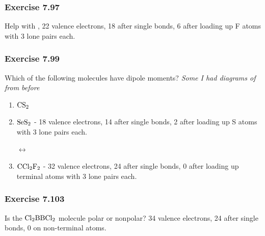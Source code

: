 \documentclass[11pt]{article}
\begin{document}
\subsubsection{Exercise 7.97}

Help with , 22 valence electrons, 18 after single bonds, 6 after loading up F atoms with 3 lone pairs each. \\[2ex]

\subsubsection{Exercise 7.99}

Which of the following molecules have dipole moments?
\emph{Some I had diagrams of from before}

\begin{enumerate}

\item $\ce{CS2}$

\item $\ce{SeS2}$ - 18 valence electrons, 14 after single bonds, 2 after loading up S atoms with 3 lone pairs each.

\qquad $\longleftrightarrow$ \qquad
{}

\item $\ce{CCl2F2}$ - 32 valence electrons, 24 after single bonds, 0 after loading up terminal atoms with 3 lone pairs each.


\end{enumerate}

\subsubsection{Exercise 7.103}

Is the $\ce{Cl2BBCl2}$ molecule polar or nonpolar?  34 valence electrons, 24 after single bonds, 0 on non-terminal atoms. \\[2ex]
\end{document}
